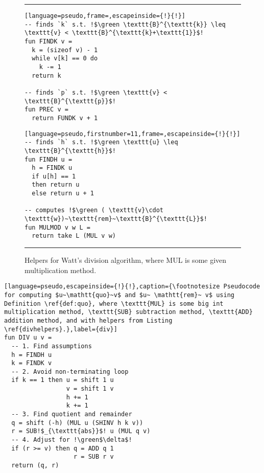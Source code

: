 \begin{figure}
{
\hrule\vspace*{-0.4ex}
\begin{minipage}{.45\textwidth}
\begin{lstlisting}[language=pseudo,frame=,escapeinside={!}{!}]
-- finds `k` s.t. !$\green \texttt{B}^{\texttt{k}} \leq \texttt{v} < \texttt{B}^{\texttt{k}+\texttt{1}}$!
fun FINDK v =
  k = (sizeof v) - 1
  while v[k] == 0 do
    k -= 1
  return k

-- finds `p` s.t. !$\green \texttt{v} < \texttt{B}^{\texttt{p}}$!
fun PREC v =
  return FUNDK v + 1
\end{lstlisting}
\end{minipage}\hfill
\begin{minipage}{.45\textwidth}
\begin{lstlisting}[language=pseudo,firstnumber=11,frame=,escapeinside={!}{!}]
-- finds `h` s.t. !$\green \texttt{u} \leq \texttt{B}^{\texttt{h}}$!
fun FINDH u =
  h = FINDK u
  if u[h] == 1
  then return u
  else return u + 1

-- computes !$\green ( \texttt{v}\cdot \texttt{w})~\texttt{rem}~\texttt{B}^{\texttt{L}}$!
fun MULMOD v w L =
  return take L (MUL v w)
\end{lstlisting}
\end{minipage}\vspace*{-0.8ex}
\hrule
}
\caption{\footnotesize Helpers for Watt's division algorithm, where MUL is some given multiplication method.}
\label{divhelpers}
\end{figure}

\begin{lstlisting}[language=pseudo,escapeinside={!}{!},caption={\footnotesize Pseudocode for computing $u~\mathtt{quo}~v$ and $u~ \mathtt{rem}~ v$ using Definition \ref{def:quo}, where \texttt{MUL} is some big int multiplication method, \texttt{SUB} subtraction method, \texttt{ADD} addition method, and with helpers from Listing \ref{divhelpers}.},label={div}]
fun DIV u v =
  -- 1. Find assumptions
  h = FINDH u
  k = FINDK v
  -- 2. Avoid non-terminating loop
  if k == 1 then u = shift 1 u
                 v = shift 1 v
                 h += 1
                 k += 1
  -- 3. Find quotient and remainder
  q = shift (-h) (MUL u (SHINV h k v))
  r = SUB!$_{\texttt{abs}}$! u (MUL q v)
  -- 4. Adjust for !\green$\delta$!
  if (r >= v) then q = ADD q 1
                   r = SUB r v
  return (q, r)
\end{lstlisting}

